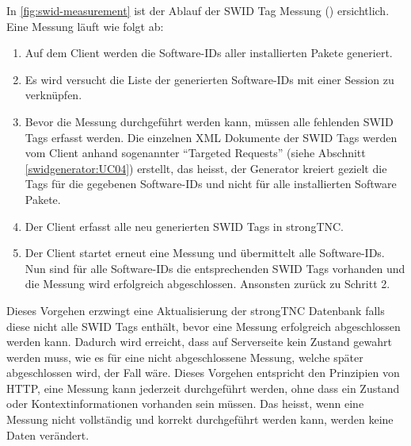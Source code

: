 In \autoref{fig:swid-measurement} ist der Ablauf der SWID Tag Messung
() ersichtlich. Eine Messung läuft wie folgt ab:

\begin{enumerate}
	\item Auf dem Client werden die Software-IDs aller installierten Pakete generiert. 
	
	\item Es wird versucht die Liste der generierten Software-IDs mit einer Session
	zu verknüpfen.
		
	\item Bevor die Messung durchgeführt werden kann, müssen alle fehlenden SWID
	Tags erfasst werden. Die einzelnen XML Dokumente der SWID Tags werden vom
	Client anhand sogenannter \enquote{Targeted Requests} (siehe Abschnitt
	\ref{swidgenerator:UC04}) erstellt, das heisst, der Generator kreiert gezielt
	die Tags für die gegebenen Software-IDs und nicht für alle installierten
	Software Pakete.
	
	\item Der Client erfasst alle neu generierten SWID Tags in strongTNC.
	
	\item Der Client startet erneut eine Messung und übermittelt alle Software-IDs.
	Nun sind für alle Software-IDs die entsprechenden SWID Tags vorhanden und die
	Messung wird erfolgreich abgeschlossen. Ansonsten zurück zu Schritt 2.
\end{enumerate}

Dieses Vorgehen erzwingt eine Aktualisierung der strongTNC Datenbank falls diese
nicht alle SWID Tags enthält, bevor eine Messung erfolgreich abgeschlossen
werden kann. Dadurch wird erreicht, dass auf Serverseite kein Zustand gewahrt
werden muss, wie es für eine nicht abgeschlossene Messung, welche später
abgeschlossen wird, der Fall wäre. Dieses Vorgehen entspricht den Prinzipien von
HTTP, eine Messung kann jederzeit durchgeführt werden, ohne dass ein Zustand
oder Kontextinformationen vorhanden sein müssen. Das heisst, wenn eine Messung
nicht vollständig und korrekt durchgeführt werden kann, werden keine Daten
verändert.

